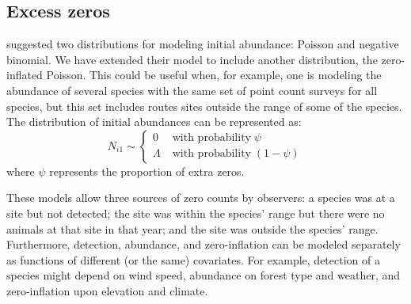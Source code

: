 \documentclass[12pt]{article}
\begin{document}
\subsection{Excess zeros}

\citet{dail_madsen:2011} suggested two distributions for
modeling
initial abundance: Poisson and negative binomial. We have
extended
their model to include another distribution, the zero-inflated
Poisson. This could be useful when, for example, one is modeling
the
abundance of several species with the same set of point
count surveys for all species, but this set includes routes
sites
outside the range of some of the species. The distribution
of
initial abundances can be represented as:
\begin{equation}
N_{i1} \sim \left\{
\begin{aligned}
0 &\; \text{with probability} \; \psi \\
\Lambda &\; \text{with probability} \; (1-\psi)
\end{aligned} \right.
\label{eq:ZIP}
\end{equation}
where $\psi$ represents the proportion of extra zeros.

These models allow three sources of zero counts by observers: a
species was at a site but not detected; the site was within the
species' range but there were no animals at that site in that
year; and the site was outside the species' range. Furthermore,
detection, abundance, and zero-inflation can be modeled separately as
functions of different (or the same) covariates. For example, detection of a
species might depend on wind speed,
abundance on forest type and weather, and zero-inflation upon elevation and
climate.  


\end{document}
